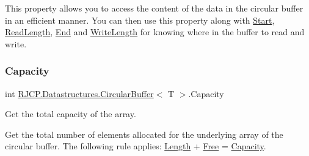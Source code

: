 This property allows you to access the content of the data in the circular buffer in an efficient manner. You can then use this property along with \mbox{\hyperlink{class_r_j_c_p_1_1_datastructures_1_1_circular_buffer_ae484f7e6b94997f0079b1d826db7debb}{Start}}, \mbox{\hyperlink{class_r_j_c_p_1_1_datastructures_1_1_circular_buffer_a8d1a90d644b39034c00441161506295a}{Read\+Length}}, \mbox{\hyperlink{class_r_j_c_p_1_1_datastructures_1_1_circular_buffer_a8e98be8b2cf3d34965db9d7813443169}{End}} and \mbox{\hyperlink{class_r_j_c_p_1_1_datastructures_1_1_circular_buffer_aea438c0f691cf035c02a7fdbce551e01}{Write\+Length}} for knowing where in the buffer to read and write. \mbox{\label{class_r_j_c_p_1_1_datastructures_1_1_circular_buffer_a823e88a213f382917ea0f9f9170c14af}} 
\subsubsection{\texorpdfstring{Capacity}{Capacity}}
{\footnotesize\ttfamily int \mbox{\hyperlink{class_r_j_c_p_1_1_datastructures_1_1_circular_buffer}{R\+J\+C\+P.\+Datastructures.\+Circular\+Buffer}}$<$ T $>$.Capacity\hspace{0.3cm}{\ttfamily [get]}}



Get the total capacity of the array. 

Get the total number of elements allocated for the underlying array of the circular buffer. The following rule applies\+: \mbox{\hyperlink{class_r_j_c_p_1_1_datastructures_1_1_circular_buffer_a92b47b98334085d7655fd547b8d46c69}{Length}} + \mbox{\hyperlink{class_r_j_c_p_1_1_datastructures_1_1_circular_buffer_a4ce60906784a0ded9d17cc8cfccf846d}{Free}} = \mbox{\hyperlink{class_r_j_c_p_1_1_datastructures_1_1_circular_buffer_a823e88a213f382917ea0f9f9170c14af}{Capacity}}. \mbox{\label{class_r_j_c_p_1_1_datastructures_1_1_circular_buffer_a8e98be8b2cf3d34965db9d7813443169}} 
